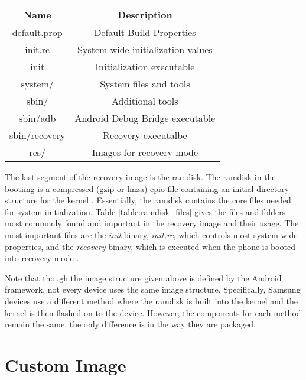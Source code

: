 \begin{table*}[!t]
\begin{center}
\small
\begin{tabular}{|c|c|}
\hline
 {\bf Name}  & {\bf Description} \\
\hline
\hline
default.prop & Default Build Properties \\
\hline
init.rc & System-wide initialization values  \\
\hline
init & Initialization executable  \\
\hline
system/ & System files and tools   \\
\hline
sbin/ & Additional tools   \\
\hline
sbin/adb & Android Debug Bridge executable   \\
\hline
sbin/recovery & Recovery executalbe  \\
\hline
res/ & Images for recovery mode \\
\hline
\end{tabular}
\end{center}
\caption{Important Ramdisk Files}
\label{table:ramdisk_files}
\end{table*}

The last segment of the recovery image is the ramdisk.  The ramdisk in the bootimg is a compressed (gzip or lmza) cpio file containing an initial directory structure for the kernel \cite{android_developers}.  Essentially, the ramdisk contains the core files needed for system initialization.   Table \ref{table:ramdisk_files} gives the files and folders most commonly found and important in the recovery image and their usage.  The most important files are the \emph{init} binary, \emph{init.rc}, which controls most system-wide properties, and the \emph{recovery} binary, which is executed when the phone is booted into recovery mode \cite{rootzwiki_unpack}.

Note that though the image structure given above is defined by the Android framework, not every device uses the same image structure.  Specifically, Samsung devices use a different method where the ramdisk is built into the kernel and the kernel is then flashed on to the device.  However, the components for each method remain the same, the only difference is in the way they are packaged.

\section{Custom Image}
\label{sec:custom_image}

